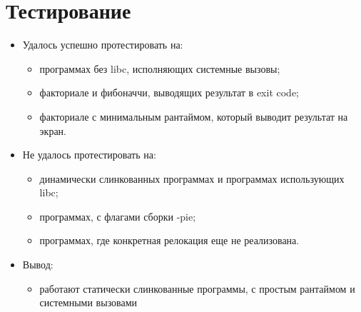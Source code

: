 
\section{Тестирование}
\begin{itemize}
    \item Удалось успешно протестировать на:
          \begin{itemize}
              \item программах без libc, исполняющих системные вызовы;
              \item факториале и фибоначчи, выводящих результат в exit code;
              \item факториале с минимальным рантаймом, который выводит результат на экран.
          \end{itemize}
    \item Не удалось протестировать на:
          \begin{itemize}
              \item динамически слинкованных программах и программах использующих libc;
              \item программах, с флагами сборки -pie;
              \item программах, где конкретная релокация еще не реализована.
          \end{itemize}
    \item Вывод:
          \begin{itemize}
              \item работают статически слинкованные программы, с простым рантаймом и системными вызовами
          \end{itemize}
\end{itemize}



